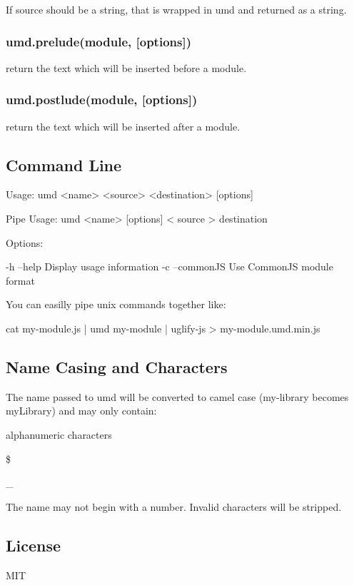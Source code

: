 If {\ttfamily source} should be a string, that is wrapped in umd and returned as a string.

\subsubsection*{umd.\+prelude(module, \mbox{[}options\mbox{]})}

return the text which will be inserted before a module.

\subsubsection*{umd.\+postlude(module, \mbox{[}options\mbox{]})}

return the text which will be inserted after a module.

\subsection*{Command Line}


\begin{DoxyCode}
Usage: umd <name> <source> <destination> [options]

Pipe Usage: umd <name> [options] < source > destination

Options:

 -h --help     Display usage information
 -c --commonJS Use CommonJS module format
\end{DoxyCode}


You can easilly pipe unix commands together like\+:


\begin{DoxyCode}
cat my-module.js | umd my-module | uglify-js > my-module.umd.min.js
\end{DoxyCode}


\subsection*{Name Casing and Characters}

The {\ttfamily name} passed to {\ttfamily umd} will be converted to camel case ({\ttfamily my-\/library} becomes {\ttfamily my\+Library}) and may only contain\+:


\begin{DoxyItemize}
\item alphanumeric characters
\item \$
\item \+\_\+
\end{DoxyItemize}

The name may not begin with a number. Invalid characters will be stripped.

\subsection*{License}

M\+IT 